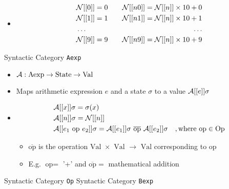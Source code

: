 \begin{itemize}
\begin{itemize}
\begin{itemize}
\begin{itemize}
                        \end{itemize}
                    \item
                        \begin{align*}
                            &\mathcal{N}[[0]] = 0 \quad &\mathcal{N}[[n 0]] = \mathcal{N}[[n]] \times 10 + 0\\
                            &\mathcal{N}[[1]] = 1 \quad &\mathcal{N}[[n 1]] = \mathcal{N}[[n]] \times 10 + 1\\
                            &\dots \quad &\dots\\
                            &\mathcal{N}[[9]] = 9 \quad &\mathcal{N}[[n 9]] = \mathcal{N}[[n]] \times 10 + 9\\
                        \end{align*}
                \end{itemize}
             Syntactic Category \verb+Aexp+
                \begin{itemize}
                    \item $\mathcal{A}: \text{Aexp} \to \text{State} \to \text{Val}$
                    \item Maps arithmetic expression $e$ and a state $\sigma$ to a value $\mathcal{A}[[e]]\sigma$
                    \item
                        \begin{align*}
                            &\mathcal{A}[[x]]\sigma = \sigma(x)\\
                            &\mathcal{A}[[n]]\sigma = \mathcal{N}[[n]]\\
                            &\mathcal{A}[[e_1 \text{ op } e_2]]\sigma = \mathcal{A}[[e_1]] \sigma \ \overline{\text{op}} \ \mathcal{A}[[e_2]] \sigma \quad , \text{where op} \in \text{Op}
                        \end{align*}
                        \begin{itemize}
                            \item $\overline{\text{op}}$ is the operation $\text{Val } \times \text{ Val } \to \text{ Val}$ corresponding to $\text{op}$
                            \item E.g. $\text{op} =$ '+' and $\overline{\text{op}} =$ mathematical addition
                        \end{itemize}
                \end{itemize}
             Syntactic Category \verb+Op+
             Syntactic Category \verb+Bexp+
                \begin{itemize}

\end{itemize}
\end{itemize}
\end{itemize}
